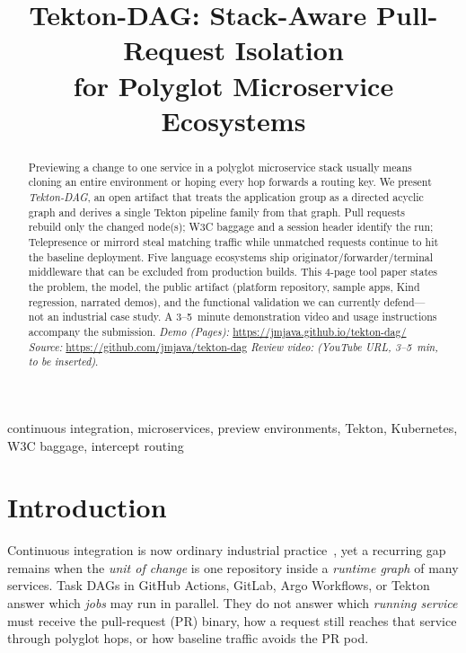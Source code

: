 \documentclass[10pt,conference]{IEEEtran}
\begin{document}
\title{Tekton-DAG: Stack-Aware Pull-Request Isolation\\for Polyglot Microservice Ecosystems}

\author{
}

\maketitle

\begin{abstract}
Previewing a change to one service in a polyglot microservice stack usually means cloning an entire environment or hoping every hop forwards a routing key. We present \emph{Tekton-DAG}, an open artifact that treats the application group as a directed acyclic graph and derives a single Tekton pipeline family from that graph. Pull requests rebuild only the changed node(s); W3C baggage and a session header identify the run; Telepresence or mirrord steal matching traffic while unmatched requests continue to hit the baseline deployment. Five language ecosystems ship originator/forwarder/terminal middleware that can be excluded from production builds. This 4-page tool paper states the problem, the model, the public artifact (platform repository, sample apps, Kind regression, narrated demos), and the functional validation we can currently defend---not an industrial case study. A 3--5~minute demonstration video and usage instructions accompany the submission.
\textit{Demo (Pages):} \url{https://jmjava.github.io/tekton-dag/}
\textit{Source:} \url{https://github.com/jmjava/tekton-dag}
\textit{Review video:} \textit{(YouTube URL, 3--5~min, to be inserted)}.
\end{abstract}

\begin{IEEEkeywords}
continuous integration, microservices, preview environments, Tekton, Kubernetes, W3C baggage, intercept routing
\end{IEEEkeywords}

\section{Introduction}

Continuous integration is now ordinary industrial practice~\cite{hilton2016usage,shahin2017continuous,humble2010continuous}, yet a recurring gap remains when the \emph{unit of change} is one repository inside a \emph{runtime graph} of many services. Task DAGs in GitHub Actions, GitLab, Argo Workflows, or Tekton answer which \emph{jobs} may run in parallel. They do not answer which \emph{running service} must receive the pull-request (PR) binary, how a request still reaches that service through polyglot hops, or how baseline traffic avoids the PR pod.
\end{document}
